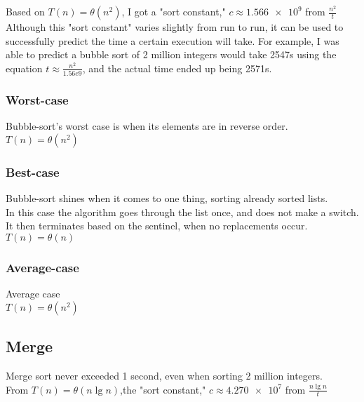 \documentclass{article}
\begin{document}
	Based on $T(n) = \theta (n^2)$, I got a "sort constant," $c \approx \num{1.566e9}$ from $\frac{n^2}{t}$ \\

Although this "sort constant" varies slightly from run to run, it can be used to successfully predict the time a certain
execution will take. For example, I was able to predict a bubble sort of 2 million integers would take 2547s using
the equation $t \approx \frac{n^2}{1.56e9}$, and the actual time ended up being 2571s.

\subsubsection{Worst-case}

Bubble-sort's worst case is when its elements are in reverse order. \\

	$T(n) = \theta (n^2)$

\subsubsection{Best-case}

Bubble-sort shines when it comes to one thing, sorting already sorted lists. \\
In this case the algorithm goes through the list once, and does not make a switch. It then 
terminates based on the sentinel, when no replacements occur. \\

	$T(n) = \theta (n)$

\subsubsection{Average-case}

Average case  \\

	$T(n) = \theta (n^2)$

\newpage


\subsection{Merge}

Merge sort never exceeded 1 second, even when sorting 2 million integers.\\

	From $T(n) = \theta (n \lg{n})$,the "sort constant," $c \approx \num{4.270e7}$ from $\frac{n \lg{n}}{t}$ \\
\end{document}
